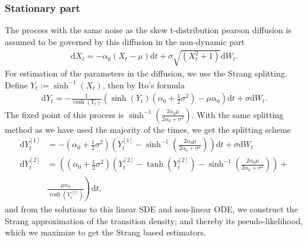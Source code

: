\subsubsection{Stationary part}
The process with the same noise as the skew t-distribution pearson diffusion is assumed to be governed by this diffusion in the non-dynamic part
\begin{align}
    \mathrm{d}X_t = -\alpha_0\left(X_t - \mu\right)\mathrm{d}t + \sigma \sqrt{\left(X_t^2 + 1\right)}\mathrm{d}W_t.
\end{align}
For estimation of the parameters in the diffusion, we use the Strang splitting. Define $Y_t := \sinh^{-1}(X_t)$, then by Ito's formula
\begin{align}
    \mathrm{d}Y_t = - \frac{1}{\cosh(Y_t)}\left(\sinh(Y_t)\left(\alpha_0 + \frac{1}{2}\sigma^2\right) - \mu\alpha_0\right)\mathrm{d}t + \sigma \mathrm{d}W_t.
\end{align}
The fixed point of this process is $\sinh^{-1}(\frac{2\alpha_0\mu}{2\alpha_0 + \sigma^2})$. With the same splitting method as we have used the majority of the times, we get the splitting scheme
\begin{align}
    \mathrm{d}Y_t^{[1]} &= -\left(\alpha_0 + \frac{1}{2}\sigma^2\right)\left(Y_t^{[1]} - \sinh^{-1}\left(\frac{2\alpha_0\mu}{2\alpha_0 + \sigma^2}\right)\right)\mathrm{d}t + \sigma \mathrm{d}W_t \\
    \mathrm{d}Y_t^{[2]} &= \left(\left(\alpha_0 + \frac{1}{2}\sigma^2\right) \left(Y_t^{[2]} - \tanh\left(Y_t^{[2]}\right) - \sinh^{-1}\left(\frac{2\alpha_0\mu}{2\alpha_0 + \sigma^2}\right)\right) + \right. \nonumber \\
    &\left. \frac{\mu\alpha_0}{\cosh\left(Y_t^{[2]}\right)}\right)\mathrm{d}t, \label{eq:StrangTDiffusion}
\end{align}
and from the solutions to this linear SDE and non-linear ODE, we construct the Strang approximation of the transition density; and thereby its pseudo-likelihood, which we maximize to get the Strang based estimators.
